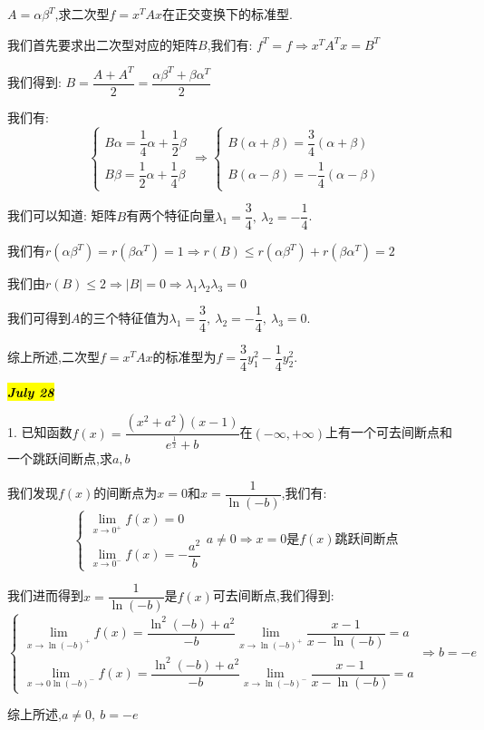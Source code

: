 \begin{anymark}[变式]
	$A=\alpha\beta^{T}$,求二次型$f=x^{T}Ax$在正交变换下的标准型.
	\begin{solution}
		
		我们首先要求出二次型对应的矩阵$B$,我们有: $f^{T}=f\Rightarrow x^{T}A^{T}x=B^{T}$
		
		我们得到: $B=\dfrac{A+A^{T}}{2}=\dfrac{\alpha\beta^{T}+\beta\alpha^{T}}{2}$
		
		我们有: 
		$$\left\lbrace
		\begin{array}{l}
			B\alpha=\dfrac{1}{4}\alpha+\dfrac{1}{2}\beta\\
			B\beta=\dfrac{1}{2}\alpha+\dfrac{1}{4}\beta
		\end{array}
		\right. \Rightarrow \left\lbrace
		\begin{array}{l}
			B(\alpha+\beta)=\dfrac{3}{4}(\alpha+\beta)\\
			B(\alpha-\beta)=-\dfrac{1}{4}(\alpha-\beta)
		\end{array}
		\right.$$
		
		我们可以知道: 矩阵$B$有两个特征向量$\lambda_{1}=\dfrac{3}{4},\ \lambda_{2}=-\dfrac{1}{4}$.
		
		我们有$r(\alpha\beta^{T})=r(\beta\alpha^{T})=1\Rightarrow r(B)\leq r(\alpha\beta^{T})+r(\beta\alpha^{T})=2$
		
		我们由$r(B)\leq 2\Rightarrow |B|=0\Rightarrow \lambda_{1}\lambda_{2}\lambda_{3}=0$
		
		我们可得到$A$的三个特征值为$\lambda_{1}=\dfrac{3}{4},\ \lambda_{2}=-\dfrac{1}{4},\ \lambda_{3}=0$.
		
		综上所述,二次型$f=x^{T}Ax$的标准型为$f=\dfrac{3}{4}y_{1}^2-\dfrac{1}{4}y_{2}^{2}$.
	\end{solution}
\end{anymark}

\hl{\textbf{\textit{July 28}}}

1. 已知函数$f(x)=\dfrac{(x^2+a^2)(x-1)}{e^{\frac{1}{x}}+b}$在$(-\infty,+\infty)$上有一个可去间断点和一个跳跃间断点,求$a,b$
\begin{solution}
	
	我们发现$f(x)$的间断点为$x=0$和$x=\dfrac{1}{\ln(-b)}$,我们有: 
	$$\left\lbrace
	\begin{array}{l}
		\lim\limits_{x\rightarrow 0^{+}}f(x)=0\\
		\lim\limits_{x\rightarrow 0^{-}}f(x)=-\dfrac{a^2}{b}
	\end{array}
	\right. a\neq 0\Rightarrow x=0\text{是}f(x)\text{跳跃间断点}$$
	
	我们进而得到$x=\dfrac{1}{\ln(-b)}$是$f(x)$可去间断点,我们得到: 
	$$\left\lbrace
	\begin{array}{l}
		\lim\limits_{x\rightarrow \ln(-b)^{+}}f(x)=\dfrac{\ln^2(-b)+a^2}{-b}\lim\limits_{x\rightarrow \ln(-b)^{+}}\dfrac{x-1}{x-\ln(-b)}=a\\
		\lim\limits_{x\rightarrow 0\ln(-b)^{-}}f(x)=\dfrac{\ln^2(-b)+a^2}{-b}\lim\limits_{x\rightarrow \ln(-b)^{-}}\dfrac{x-1}{x-\ln(-b)}=a
	\end{array}
	\right. \Rightarrow b=-e$$
	
	综上所述,$a\neq 0,\ b=-e$
\end{solution}

